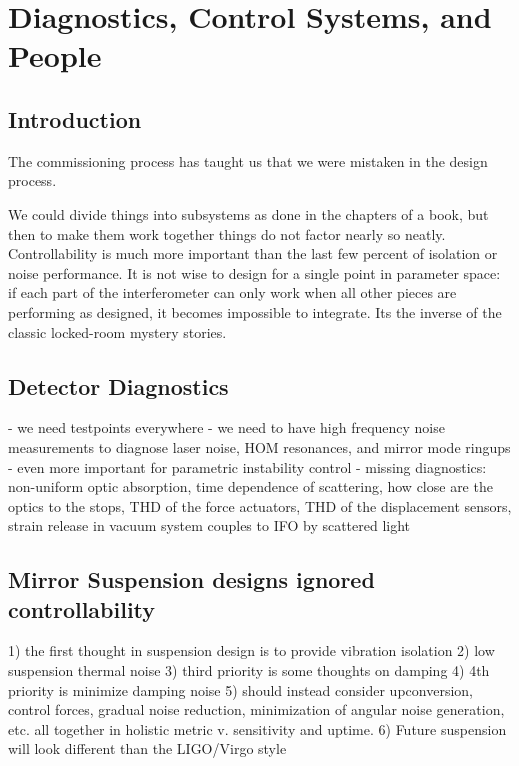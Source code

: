 \chapter[Diagnostics, Control Systems, and People]{Diagnostics, Control Systems, and People\label{ch7}}

\section{Introduction}\label{sec7.1}
The commissioning process has taught us that we were mistaken in the design process.

We could divide things into subsystems as done in the chapters of a book, but then 
to make them work together things do not factor nearly so neatly. Controllability is 
much more important than the last few percent of isolation or noise performance. It
is not wise to design for a single point in parameter space: if each part of the interferometer
can only work when all other pieces are performing as designed, it becomes impossible
to integrate. Its the inverse of the classic locked-room mystery stories.


\section{Detector Diagnostics}
   - we need testpoints everywhere
   - we need to have high frequency noise measurements to diagnose laser noise, HOM resonances, and mirror mode ringups
   - even more important for parametric instability control
   - missing diagnostics: non-uniform optic absorption, time dependence of scattering, how close are the optics to the stops, THD of the force actuators, THD of the displacement sensors, strain release in vacuum system couples to IFO by scattered light


\section{Mirror Suspension designs ignored controllability}
   1) the first thought in suspension design is to provide vibration isolation
   2) low suspension thermal noise
   3) third priority is some thoughts on damping
   4) 4th priority is minimize damping noise
   5) should instead consider upconversion, control forces, gradual noise reduction, minimization of angular noise generation, etc. all together in holistic metric v. sensitivity and uptime.
   6) Future suspension will look different than the LIGO/Virgo style


